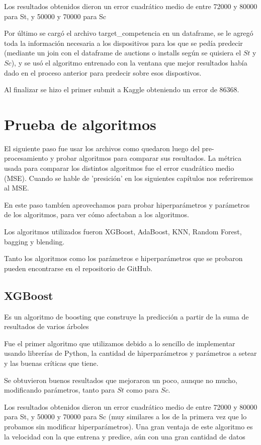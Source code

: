 \documentclass[a4paper, 12pt]{article}
\begin{document}
Los resultados obtenidos dieron un error cuadrático medio de entre 72000 y 80000 para St, y 50000 y 70000 para Sc

Por último se cargó el archivo target\_competencia en un dataframe, se le agregó toda la información necesaria a los dispositivos para los que se pedía predecir (mediante un join con el dataframe de auctions o installs según se quisiera el $St$ y $Sc$), y se usó el algoritmo entrenado con la ventana que mejor resultados había dado en el proceso anterior para predecir sobre esos dispostivos.

Al finalizar se hizo el primer submit a Kaggle obteniendo un error de 86368.

\newpage
\section{Prueba de algoritmos}
El siguiente paso fue usar los archivos como quedaron luego del pre-procesamiento y probar algoritmos para comparar sus resultados. La métrica usada para comparar los distintos algoritmos fue el error cuadrático medio (MSE). Cuando se hable de 'presición' en los siguientes capítulos nos referiremos al MSE.

En este paso tambíen aprovechamos para probar hiperparámetros y parámetros de los algoritmos, para ver cómo afectaban a los algoritmos.

Los algoritmos utilizados fueron XGBoost, AdaBoost, KNN, Random Forest, bagging y blending.

Tanto los algoritmos como los parámetros e hiperparámetros que se probaron pueden encontrarse en el repositorio de GitHub.

\subsection{XGBoost}
Es un algoritmo de boosting que construye la predicción a partir de la suma de resultados de varios árboles

Fue el primer algoritmo que utilizamos debido a lo sencillo de implementar usando librerías de Python, la cantidad de hiperparámetros y parámetros a setear y las buenas críticas que tiene.

Se obtuvieron buenos resultados que mejoraron un poco, aunque no mucho, modificando parámetros, tanto para $St$ como para $Sc$.

Los resultados obtenidos dieron un error cuadrático medio de entre 72000 y 80000 para St, y 50000 y 70000 para Sc (muy similares a los de la primera vez que lo probamos sin modificar hiperparámetros). Una gran ventaja de este algoritmo es la velocidad con la que entrena y predice, aún con una gran cantidad de datos
\end{document}

